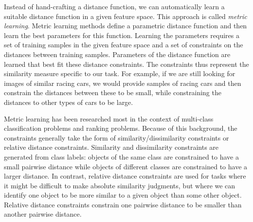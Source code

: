 Instead of hand-crafting a distance function, we can automatically learn a suitable distance function in a given feature space. This approach is called \emph{metric learning}. Metric learning methods define a parametric distance function and then learn the best parameters for this function. Learning the parameters requires a set of training samples in the given feature space and a set of constraints on the distances between training samples. Parameters of the distance function are learned that best fit these distance constraints. The constraints thus represent the similarity measure specific to our task. For example, if we are still looking for images of similar racing cars, we would provide samples of racing cars and then constrain the distances between these to be small, while constraining the distances to other types of cars to be large.

Metric learning has been researched most in the context of multi-class classification problems and ranking problems. Because of this background, the constraints generally take the form of similarity/dissimilarity constraints or relative distance constraints. Similarity and dissimilarity constraints are generated from class labels: objects of the same class are constrained to have a small pairwise distance while objects of different classes are constrained to have a larger distance. In contrast, relative distance constraints are used for tasks where it might be difficult to make absolute similarity judgments, but where we can identify one object to be more similar to a given object than some other object. Relative distance constraints constrain one pairwise distance to be smaller than another pairwise distance.


